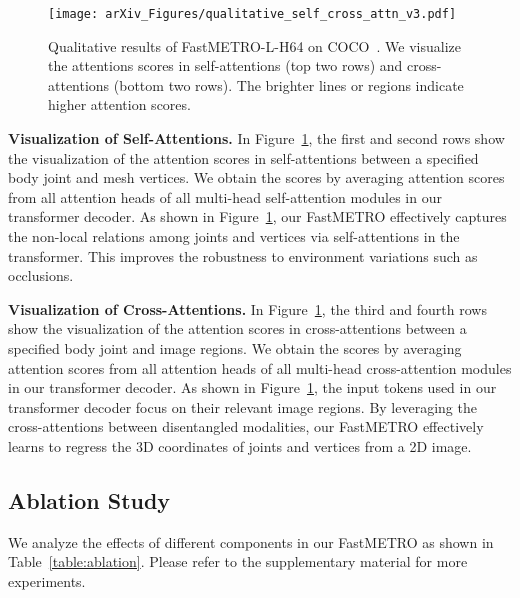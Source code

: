 \begin{figure}[t!]
    \centering
    \texttt{[image: arXiv\_Figures/qualitative\_self\_cross\_attn\_v3.pdf]}
    \caption{
    Qualitative results of FastMETRO-L-H64 on COCO~\cite{lin2014coco}.
    We visualize the attentions scores in \mbox{self-attentions} (top two rows) and \mbox{cross-attentions} (bottom two rows).
    The brighter lines or regions indicate higher attention scores.
    }
    \label{fig:qualitative_self_cross_attn}
\end{figure}

\noindent \textbf{Visualization of Self-Attentions.}
In Figure~\ref{fig:qualitative_self_cross_attn}, the first and second rows show the visualization of the attention scores in \mbox{self-attentions} between a specified body joint and mesh vertices.
We obtain the scores by averaging attention scores from all attention heads of all \mbox{multi-head} \mbox{self-attention} modules in our transformer decoder.
As shown in Figure~\ref{fig:qualitative_self_cross_attn}, our FastMETRO effectively captures the \mbox{non-local} relations among joints and vertices via \mbox{self-attentions} in the transformer.
This improves the robustness to environment variations such as occlusions.

\noindent \textbf{Visualization of Cross-Attentions.}
In Figure~\ref{fig:qualitative_self_cross_attn}, the third and fourth rows show the visualization of the attention scores in \mbox{cross-attentions} between a specified body joint and image regions.
We obtain the scores by averaging attention scores from all attention heads of all \mbox{multi-head} \mbox{cross-attention} modules in our transformer decoder.
As shown in Figure~\ref{fig:qualitative_self_cross_attn}, the input tokens used in our transformer decoder focus on their relevant image regions.
By leveraging the \mbox{cross-attentions} between disentangled modalities, 
our \mbox{FastMETRO} effectively learns to regress the 3D coordinates of joints and vertices from a 2D image.

\subsection{Ablation Study}
We analyze the effects of different components in our FastMETRO as shown in Table~\ref{table:ablation}.
Please refer to the supplementary material for more experiments.

